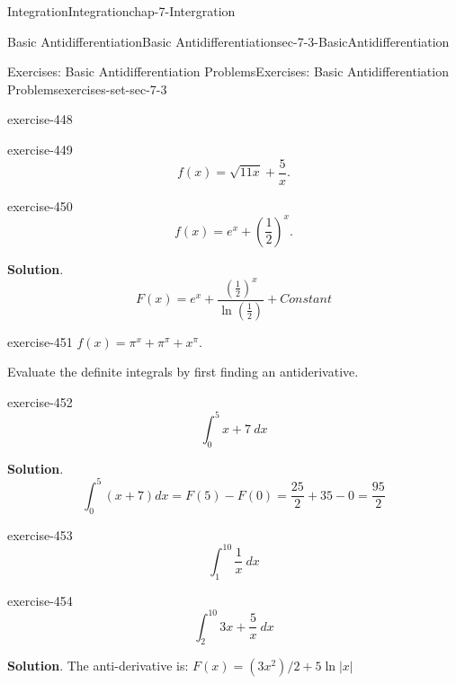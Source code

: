 \documentclass[oneside,10pt,]{book}
\numberwithin{equation}{section}
\begin{document}
\begin{chapterptx}{Integration}{}{Integration}{}{}{chap-7-Intergration}
\begin{sectionptx}{Basic Antidifferentiation}{}{Basic Antidifferentiation}{}{}{sec-7-3-BasicAntidifferentiation}
\begin{exercises-subsection-numberless}{Exercises: Basic Antidifferentiation Problems}{}{Exercises: Basic Antidifferentiation Problems}{}{}{exercises-set-sec-7-3}
\begin{divisionexercise}{3}{}{}{exercise-448}
\end{divisionexercise}%
\begin{divisionexercise}{4}{}{}{exercise-449}%
%
\begin{equation*}
f(x)=\sqrt{11x}+\frac{5}{x}.
\end{equation*}
\end{divisionexercise}%
\begin{divisionexercise}{5}{}{}{exercise-450}%
%
\begin{equation*}
f(x)=e^x+\left(\frac{1}{2}\right)^x.
\end{equation*}
\par\smallskip%
\noindent\textbf{Solution}.\hypertarget{solution-228}{}\quad%
%
\begin{equation*}
F(x)=e^x+\frac{\left(\frac{1}{2}\right)^x}{\ln\left(\frac{1}{2}\right)}+Constant
\end{equation*}
\end{divisionexercise}%
\begin{divisionexercise}{6}{}{}{exercise-451}%
\(f(x)=\pi^x+\pi^\pi+x^\pi.\)\end{divisionexercise}%
\hypertarget{p-2790}{}%
Evaluate the definite integrals by first finding an antiderivative.%
\begin{divisionexercise}{7}{}{}{exercise-452}%
%
\begin{equation*}
\int_0^5 x+7\  dx
\end{equation*}
\par\smallskip%
\noindent\textbf{Solution}.\hypertarget{solution-229}{}\quad%
%
\begin{equation*}
\int_0^5 (x+7)dx=F(5)- F(0)=\frac{25}{2}+35-0=\frac{95}{2}
\end{equation*}
\end{divisionexercise}%
\begin{divisionexercise}{8}{}{}{exercise-453}%
%
\begin{equation*}
\int_1^{10}\frac{1}{x}\  dx
\end{equation*}
\end{divisionexercise}%
\begin{divisionexercise}{9}{}{}{exercise-454}%
%
\begin{equation*}
\int_2^{10} 3x+\frac{5}{x}\  dx
\end{equation*}
\par\smallskip%
\noindent\textbf{Solution}.\hypertarget{solution-230}{}\quad%
\hypertarget{p-2792}{}%
The anti-derivative is: \(F(x)=(3x^2)/2+5 \ln|x|\)%
%
\begin{equation*}

\end{equation*}
\end{divisionexercise}
\end{exercises-subsection-numberless}
\end{sectionptx}
\end{chapterptx}
\end{document}
